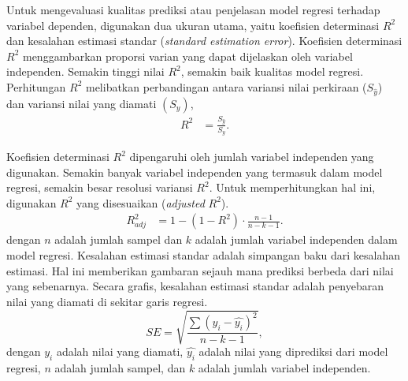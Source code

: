 \begin{spacing}{1.5}
		Untuk mengevaluasi kualitas prediksi atau penjelasan model regresi terhadap variabel dependen, digunakan dua ukuran utama, yaitu koefisien determinasi $R^2$ dan kesalahan estimasi standar (\textit{standard estimation error}). Koefisien determinasi $R^2$ menggambarkan proporsi varian yang dapat dijelaskan oleh variabel independen. Semakin tinggi nilai $R^2$, semakin baik kualitas model regresi. Perhitungan $R^2$ melibatkan perbandingan antara variansi nilai perkiraan ($S_{\hat{y}}$) dan variansi nilai yang diamati $(S_y)$,
		\begin{equation}
			\begin{aligned}
				R^2 &= \frac{S_{\hat{y}}}{S_y}.
			\end{aligned}
		\end{equation}
	
		Koefisien determinasi $R^2$  dipengaruhi oleh jumlah variabel independen yang digunakan. Semakin banyak variabel independen yang termasuk dalam model regresi, semakin besar resolusi variansi $R^2$. Untuk memperhitungkan hal ini, digunakan $R^2$ yang disesuaikan (\textit{adjusted }$R^2$).
		\begin{equation}
			\begin{aligned}
				R^2_{adj} &= 1-(1-R^2)\cdot\frac{n-1}{n-k-1}.
			\end{aligned}
		\end{equation}
		dengan $n$ adalah jumlah sampel dan $k$ adalah jumlah variabel independen dalam model regresi. Kesalahan estimasi standar adalah simpangan baku dari kesalahan estimasi. Hal ini memberikan gambaran sejauh mana prediksi berbeda dari nilai yang sebenarnya. Secara grafis, kesalahan estimasi standar adalah penyebaran nilai yang diamati di sekitar garis regresi.
		\begin{equation}
				SE = \sqrt{\frac{\sum (y_i-\hat{y_i})^2}{n-k-1}},				
		\end{equation}
		dengan $y_i$ adalah nilai yang diamati, $\hat{y_i}$ adalah nilai yang diprediksi dari model regresi, $n$ adalah jumlah sampel, dan $k$ adalah jumlah variabel independen.
\end{spacing}
\vspace{-0.5pc}

